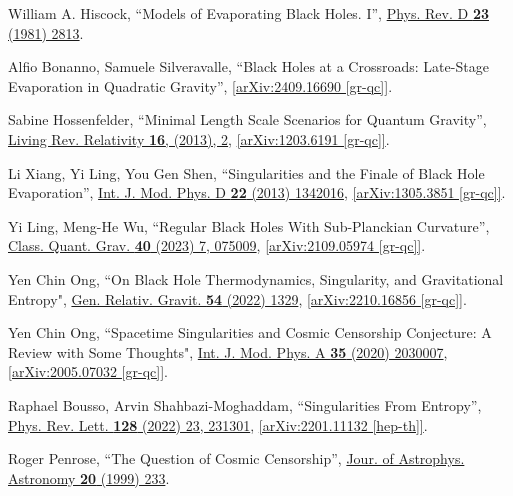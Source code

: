 \documentclass[12pt,preprintnumbers, floatfix, preprintnumbers, letterpaper, superscriptaddress,nofootinbib]{revtex4-2}
\begin{document}
\begin{thebibliography}{99}
William A. Hiscock, ``Models of Evaporating Black Holes. I'', {\href{https://journals.aps.org/prd/abstract/10.1103/PhysRevD.23.2813}{Phys. Rev. D \textbf{23} (1981) 2813}}.

Alfio Bonanno, Samuele Silveravalle, ``Black Holes at a Crossroads: Late-Stage Evaporation in Quadratic Gravity'', \href{https://arxiv.org/abs/2409.16690}{[arXiv:2409.16690 [gr-qc]]}.

Sabine Hossenfelder, ``Minimal Length Scale Scenarios for Quantum Gravity'', {\href{https://link.springer.com/article/10.12942/lrr-2013-2}{Living Rev. Relativity \textbf{16}, (2013), 2}}, \href{https://arxiv.org/abs/1203.6191}{[arXiv:1203.6191 [gr-qc]]}.


Li Xiang, Yi Ling, You Gen Shen, ``Singularities and the Finale of Black Hole Evaporation'', {\href{https://www.worldscientific.com/doi/abs/10.1142/S0218271813420169}{Int. J. Mod. Phys. D \textbf{22} (2013) 1342016}}, \href{https://arxiv.org/abs/1305.3851}{[arXiv:1305.3851 [gr-qc]]}.

Yi Ling, Meng-He Wu, ``Regular Black Holes With Sub-Planckian Curvature'', {\href{https://iopscience.iop.org/article/10.1088/1361-6382/acc0c9}{Class. Quant. Grav. \textbf{40} (2023) 7, 075009}}, \href{https://arxiv.org/abs/2109.05974}{[arXiv:2109.05974 [gr-qc]]}.


Yen Chin Ong, ``On Black Hole Thermodynamics, Singularity, and Gravitational Entropy",  {\href{https://link.springer.com/article/10.1007/s10714-022-03008-0}{Gen. Relativ. Gravit. \textbf{54} (2022) 1329}},  \href{https://arxiv.org/abs/2210.16856}{[arXiv:2210.16856 [gr-qc]]}.

Yen Chin Ong, ``Spacetime Singularities and Cosmic Censorship Conjecture: A Review with Some Thoughts", {\href{https://www.worldscientific.com/doi/abs/10.1142/S0217751X20300070}{Int. J. Mod. Phys. A \textbf{35} (2020) 2030007}}, \href{https://arxiv.org/abs/2005.07032}{[arXiv:2005.07032 [gr-qc]]}.


Raphael Bousso, Arvin Shahbazi-Moghaddam, ``Singularities From Entropy'', {\href{Phys.Rev.Lett. 128 (2022) 23, 231301}{Phys. Rev. Lett. \textbf{128} (2022) 23, 231301}}, \href{https://arxiv.org/abs/2201.11132}{[arXiv:2201.11132 [hep-th]]}.

Roger Penrose, ``The Question of Cosmic Censorship'',
{\href{https://adsabs.harvard.edu/full/1999JApA...20..233P}{Jour. of Astrophys. Astronomy \textbf{20} (1999) 233}}.


\end{thebibliography}
\end{document}
